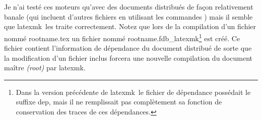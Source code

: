 \documentclass[11pt,french]{article}
\newcommand{\latexmk}{\textsf{latexmk}}
\newcommand{\cmd}[1]{\textsf{#1}}
\begin{document}
Je n'ai testé ces moteurs qu'avec des documents distribués de façon relativement banale (qui incluent d'autres fichiers en utilisant les commandes \verb||) mais il semble que \latexmk\ les traite correctement. Notez que lors de la compilation d'un fichier nommé \cmd{rootname.tex} un fichier nommé \cmd{rootname.fdb\_latexmk}\footnote{Dans la version précédente de \latexmk\ le fichier de dépendance possédait le suffixe \cmd{dep}, mais il ne remplissait pas complètement sa fonction de conservation des traces de ces dépendances.} est créé. Ce fichier contient l'information de dépendance du document distribué de sorte que la modification d'un fichier inclus forcera une nouvelle compilation du document maître \emph{(root)} par \latexmk.

\end{document}
